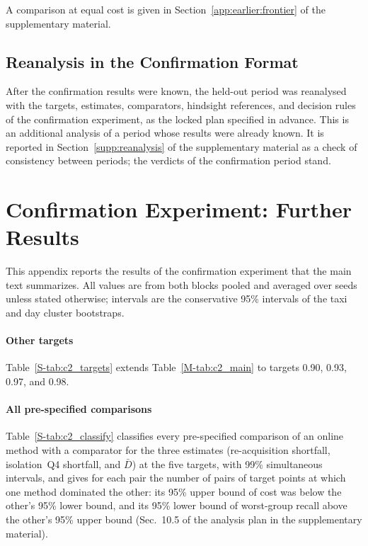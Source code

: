 A comparison at equal cost is given in Section~\ref{app:earlier:frontier} of the supplementary material.

\subsection{Reanalysis in the Confirmation Format}
\label{app:earlier:reanalysis}

After the confirmation results were known, the held-out period was reanalysed
with the targets, estimates, comparators, hindsight references, and decision
rules of the confirmation experiment, as the locked plan specified in advance.
This is an additional analysis of a period whose results were already known. It
is reported in Section~\ref{supp:reanalysis} of the supplementary material as a
check of consistency between periods; the verdicts of the confirmation period
stand.

\begin{table}[t]
\centering
\caption{Parameter values of the experiments.}
\label{tab:parameters}
\footnotesize

\end{table}



\section{Confirmation Experiment: Further Results}
\label{app:confirm2}

This appendix reports the results of the confirmation experiment that the main
text summarizes. All values are from both blocks pooled and averaged over seeds
unless stated otherwise; intervals are the conservative 95\% intervals of the
taxi and day cluster bootstraps.

\paragraph*{Other targets}
Table~\ref{S-tab:c2_targets} extends Table~\ref{M-tab:c2_main} to targets 0.90,
0.93, 0.97, and 0.98.


\paragraph*{All pre-specified comparisons}
Table~\ref{S-tab:c2_classify} classifies every pre-specified comparison of an
online method with a comparator for the three estimates (re-acquisition
shortfall, isolation~Q4 shortfall, and $\bar{D}$) at the five targets, with 99\%
simultaneous intervals, and gives for each pair the number of pairs of target
points at which one method dominated the other: its 95\% upper bound of cost was
below the other's 95\% lower bound, and its 95\% lower bound of worst-group
recall above the other's 95\% upper bound (Sec.~10.5 of the analysis plan in
the supplementary material).


